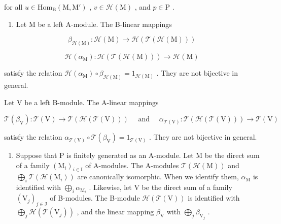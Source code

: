 for all \(u \in \mathrm{Hom}_{\mathrm{B}}(\mathrm{M}, \mathrm{M}')\) , \(v \in \mathcal{H}(\mathrm{M})\) , and \(p \in \mathrm{P}\) .

\begin{enumerate}
\def\labelenumi{\arabic{enumi})}
\setcounter{enumi}{1}
\tightlist
\item
  Let \(\mathrm{M}\) be a left A-module. The B-linear mappings
\end{enumerate}

\[
\beta_ {\mathcal {H} (\mathrm{M})}: \mathcal {H} (\mathrm{M}) \to \mathcal {H} (\mathcal {T} (\mathcal {H} (\mathrm{M})))
\]

\[
\mathcal {H} (\alpha_ {\mathrm{M}}): \mathcal {H} (\mathcal {T} (\mathcal {H} (\mathrm{M}))) \to \mathcal {H} (\mathrm{M})
\]

satisfy the relation \(\mathcal{H}(\alpha_{\mathrm{M}})\circ\beta_{\mathcal{H}(\mathrm{M})}=1_{\mathcal{H}(\mathrm{M})}\) . They are not bijective in general.

Let V be a left B-module. The A-linear mappings

\[
\mathcal {T} (\beta_ {\mathrm{V}}): \mathcal {T} (\mathrm{V}) \to \mathcal {T} (\mathcal {H} (\mathcal {T} (\mathrm{V}))) \quad \text { and } \quad \alpha_ {\mathcal {T} (\mathrm{V})}: \mathcal {T} (\mathcal {H} (\mathcal {T} (\mathrm{V}))) \to \mathcal {T} (\mathrm{V})
\]

satisfy the relation \(\alpha_{\mathcal{T}(\mathrm{V})}\circ \mathcal{T}(\beta_{\mathrm{V}}) = 1_{\mathcal{T}(\mathrm{V})}\) . They are not bijective in general.

\begin{enumerate}
\def\labelenumi{\arabic{enumi})}
\setcounter{enumi}{2}
\tightlist
\item
  Suppose that P is finitely generated as an A-module. Let M be the direct sum of a family \((\mathrm{M}_{i})_{i\in\mathrm{I}}\) of A-modules. The A-modules \(\mathcal{T}(\mathcal{H}(\mathrm{M}))\) and \(\bigoplus_{i}\mathcal{T}(\mathcal{H}(\mathrm{M}_{i}))\) are canonically isomorphic. When we identify them, \(\alpha_{\mathrm{M}}\) is identified with \(\bigoplus_{i}\alpha_{\mathrm{M}_{i}}\) . Likewise, let V be the direct sum of a family \((\mathrm{V}_j)_{j\in \mathrm{J}}\) of B-modules. The B-module \(\mathcal{H}(\mathcal{T}(\mathrm{V}))\) is identified with \(\bigoplus_{j}\mathcal{H}(\mathcal{T}(\mathrm{V}_{j}))\) , and the linear mapping \(\beta_{\mathrm{V}}\) with \(\bigoplus_{j}\beta_{\mathrm{V}_{j}}\) .
\end{enumerate}

